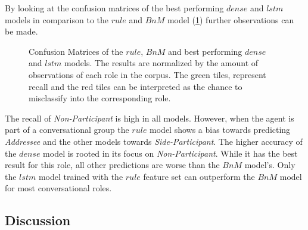 By looking at the confusion matrices of the best performing \(dense\) and \(lstm\) models in comparison to the \(rule\) and \(BnM\) model (\cref{fig:role-cm}) further observations can be made.  
\begin{figure}[htbp]
    \centering
    \begin{footnotesize}
    
    \end{footnotesize}
    \caption[Confusion Matrices of Best Role Models.]{\label{fig:role-cm} 
    Confusion Matrices of the \(rule\), \(BnM\) and best performing \(dense\) and \(lstm\) models.
    The results are normalized by the amount of observations of each role in the corpus.
    The green tiles, represent \gls{recall} and the red tiles can be interpreted as the chance to misclassify into the corresponding role.
    }
\end{figure}
%
The \gls{recall} of \emph{Non-Participant} is high in all models.
%
However, when the agent is part of a \gls{conversational group} the \(rule\) model shows a bias towards predicting \emph{Addressee} and the other models towards \emph{Side-Participant}.
%
The higher accuracy of the \(dense\) model is rooted in its focus on \emph{Non-Participant}. 
While it has the best result for this role, all other predictions are worse than the \(BnM\) model's.
%
Only the \(lstm\) model trained with the \(rule\) feature set can outperform the \(BnM\) model for most \glspl{conversational role}.

\subsection{Discussion}


